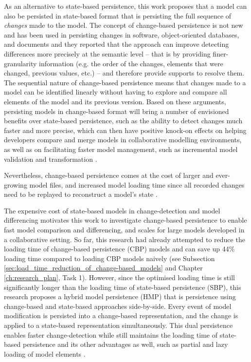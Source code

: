 \documentclass[12pt, a4paper]{report} \usepackage[titletoc]{appendix}
\begin{document}
As an alternative to state-based persistence, this work proposes that a model can also be persisted in state-based format that is persisting the full sequence of \emph{changes} made to the model. The concept of change-based persistence is not new and has been used in persisting changes in software, object-oriented databases, and documents \cite{mens2002state,DBLP:conf/sde/LippeO92,DBLP:conf/caise/IgnatN05} and they reported that the approach can improve detecting differences more precisely at the semantic level -- that is by providing finer-granularity information (e.g. the order of the changes, elements that were changed, previous values, etc.) -- and therefore provide supports to resolve them. The sequential nature of change-based persistence means that changes made to a model can be identified linearly without having to explore and compare all elements of the model and its previous version. Based on these arguments, persisting models in change-based format will bring a number of envisioned benefits over state-based persistence, such as the ability to detect changes much faster and more precise, which can then have positive knock-on effects on helping developers compare and merge models in collaborative modelling environments, as well as on facilitating faster model management, such as incremental model validation and transformation \cite{rath2012derived,ogunyomi2015property}. 

Nevertheless, change-based persistence comes at the cost of larger and ever-growing model files, and increased model loading time since all recorded changes need to be replayed to reconstruct a model's state \cite{yohannis2017turning}.

The expensive cost of state-based models in change-detection and model differencing motivates this work to investigate change-based persistence to enable fast model comparison and differencing, and scales for large models developed in a collaborative setting. So far, this research had already attempted to reduce the loading time of change-based persistence (CBP) models and can save up 44\% loading time compared to loading CBP models naively (see Subsection \ref{sec:load_time_reduction_of_change-based_models} and Chapter \ref{ch:research_plan}, Task 1). However, since the optimised loading time is still significantly longer than the loading time of state-based persistence (SBP), this research proposes a hybrid model persistence (HMP) that is persistence using change-based and state-based approaches side-by-side. Every event of model modification is persisted into a change-based representation, and the change is applied to a state-based representation simultaneously. This dual persistence enables faster change-detection while still maintains the loading time of state-based persistence and its other advantages as well, such as partial and lazy loading of model elements \cite{ran2016partial,daniel2016neoemf}.  
\end{document}
